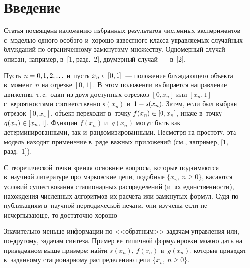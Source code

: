   



\thispagestyle{headings}

\begin{multicols}{2}

\label{st\stat}
  
  \section{Введение}
  
Статья посвящена изложению избранных результатов численных 
экспериментов с~моделью одного особого и~хорошо известного класса 
управ\-ля\-емых случайных блуж\-да\-ний по ограниченному замкнутому 
множеству. Одномерный случай описан, например, в~[1, 
разд.~2], двумерный случай~--- в~[2]. 

Пусть $n\hm=0, 1, 2, 
\ldots$ и~пусть $x_n\hm\in [0,1]$~--- положение блуж\-да\-юще\-го объекта 
в~момент~$n$ на отрезке $[0,1]$. В~этом положении выбирается 
на\-прав\-ле\-ние движения, т.\,е.\ один из двух доступных отрезков $[0,x_n]$ или 
$[x_n,1]$ с~вероятностями соответственно $s(x_n)$ и~$1\hm- s(x_n)$. Затем, 
если был вы\-бран отрезок $[0,x_n]$, объект переходит в~точку $f(x_n)\hm\in 
[0,x_n]$, иначе в~точку $g(x_n)\hm\in [x_n,1]$. Функции $f(x_n)$ и~$g(x_n)$ 
могут быть как детерминированными, так и~рандомизированными. Не\-смот\-ря 
на прос\-то\-ту, эта модель находит применение в~ряде важ\-ных приложений 
(см., например, [1, разд.~1]). 
  
  С теоретической точки зрения основные вопросы, которые поднимаются 
  в~научной литературе про марковские цепи, подобные $\{x_n, \ n\geq 0\}$, 
касаются условий существования стационарных распределений (и~их 
един\-ст\-вен\-ности), на\-хож\-де\-ния чис\-лен\-ных алгоритмов их расчета или 
замкнутых формул. Судя по пуб\-ли\-ка\-ци\-ям в~на\-уч\-ной периодической печати, 
они изучены если не ис\-чер\-пы\-ва\-юще, то достаточно хорошо. 

Значительно 
меньше информации по <<об\-рат\-ным>> задачам управ\-ле\-ния или, 
 по-дру\-го\-му, задачам синтеза. Пример ее типичной формулировки можно 
дать на приведенном выше примере: найти $s(x_n)$, $f(x_n)$ и~$g(x_n)$, 
которые приводят к~заданному стационарному распределению цепи $\{x_n,\ 
n\geq 0\}$. 
  

\end{multicols}
